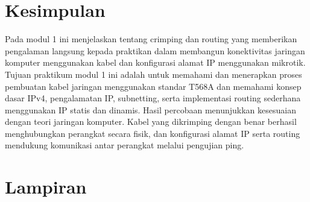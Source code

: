 \section{Kesimpulan}
Pada modul 1 ini menjelaskan tentang crimping dan routing yang memberikan pengalaman langsung kepada praktikan dalam membangun konektivitas jaringan komputer menggunakan kabel dan konfigurasi alamat IP menggunakan mikrotik. Tujuan praktikum modul 1 ini adalah untuk memahami dan menerapkan proses pembuatan kabel jaringan menggunakan standar T568A dan memahami konsep dasar IPv4, pengalamatan IP, subnetting, serta implementasi routing sederhana menggunakan IP statis dan dinamis. Hasil percobaan menunjukkan kesesuaian dengan teori jaringan komputer. Kabel yang dikrimping dengan benar berhasil menghubungkan perangkat secara fisik, dan konfigurasi alamat IP serta routing mendukung komunikasi antar perangkat melalui pengujian ping. 

\section{Lampiran}
